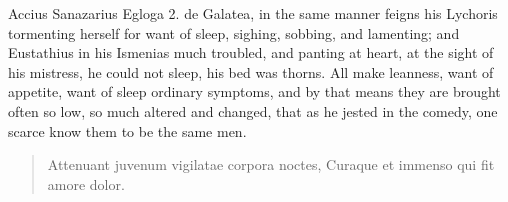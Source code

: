 Accius Sanazarius Egloga 2. de Galatea, in the same manner feigns his
Lychoris tormenting herself for want of sleep, sighing, sobbing,
and lamenting; and Eustathius in his Ismenias much troubled, and 
panting at heart, at the sight of his mistress, he could not sleep, his
bed was thorns. All make leanness, want of appetite, want of
sleep ordinary symptoms, and by that means they are brought often so
low, so much altered and changed, that as he jested in the
comedy, one scarce know them to be the same men.

\begin{latin}
\begin{verse}
Attenuant juvenum vigilatae corpora noctes,
Curaque et immenso qui fit amore dolor.
\end{verse}
\end{latin}

